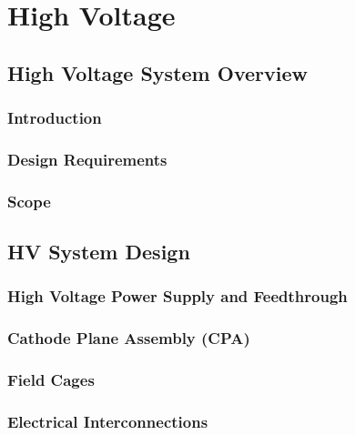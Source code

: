 \chapter{High Voltage}
\label{ch:sp-hv}

\section{High Voltage System Overview}
\label{sec:fdsp-hv-ov}

\subsection{Introduction}
\label{sec:fdsp-hv-intro}

\subsection{Design Requirements}
\label{sec:fdsp-hv-des-consid}

\subsection{Scope}
\label{sec:fdsp-hv-scope}

\section{HV System Design}
\label{sec:fdsp-hv-design}

\subsection {High Voltage Power Supply and Feedthrough}

\subsection{Cathode Plane Assembly (CPA)}

\subsection{Field Cages}

\subsection{Electrical Interconnections} %
\label{sec:fdsp-hv-design-interconnect}

